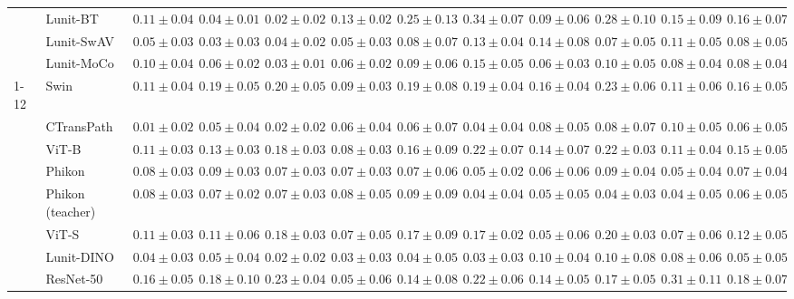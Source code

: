 \begin{tabular}{ll|cccc|c|cccc|c}
 & Lunit-BT & $0.11 \pm 0.04$ & $0.04 \pm 0.01$ & $\mathbf{0.02 \pm 0.02}$ & $0.13 \pm 0.02$ & $0.25 \pm 0.13$ & $0.34 \pm 0.07$ & $0.09 \pm 0.06$ & $0.28 \pm 0.10$ & $0.15 \pm 0.09$ & $0.16 \pm 0.07$ \\
 & Lunit-SwAV & $0.05 \pm 0.03$ & $0.03 \pm 0.03$ & $0.04 \pm 0.02$ & $0.05 \pm 0.03$ & $0.08 \pm 0.07$ & $0.13 \pm 0.04$ & $0.14 \pm 0.08$ & $0.07 \pm 0.05$ & $0.11 \pm 0.05$ & $0.08 \pm 0.05$ \\
 & Lunit-MoCo & $0.10 \pm 0.04$ & $0.06 \pm 0.02$ & $0.03 \pm 0.01$ & $0.06 \pm 0.02$ & $0.09 \pm 0.06$ & $0.15 \pm 0.05$ & $0.06 \pm 0.03$ & $0.10 \pm 0.05$ & $0.08 \pm 0.04$ & $0.08 \pm 0.04$ \\
\cline{1-12}
\multirow[t]{12}{*}{Transformer} & Swin & $0.11 \pm 0.04$ & $0.19 \pm 0.05$ & $0.20 \pm 0.05$ & $0.09 \pm 0.03$ & $0.19 \pm 0.08$ & $0.19 \pm 0.04$ & $0.16 \pm 0.04$ & $0.23 \pm 0.06$ & $0.11 \pm 0.06$ & $0.16 \pm 0.05$ \\
 & CTransPath & $\mathbf{0.01 \pm 0.02}$ & $0.05 \pm 0.04$ & $\mathbf{0.02 \pm 0.02}$ & $0.06 \pm 0.04$ & $0.06 \pm 0.07$ & $0.04 \pm 0.04$ & $0.08 \pm 0.05$ & $0.08 \pm 0.07$ & $0.10 \pm 0.05$ & $0.06 \pm 0.05$ \\
 & ViT-B & $0.11 \pm 0.03$ & $0.13 \pm 0.03$ & $0.18 \pm 0.03$ & $0.08 \pm 0.03$ & $0.16 \pm 0.09$ & $0.22 \pm 0.07$ & $0.14 \pm 0.07$ & $0.22 \pm 0.03$ & $0.11 \pm 0.04$ & $0.15 \pm 0.05$ \\
 & Phikon & $0.08 \pm 0.03$ & $0.09 \pm 0.03$ & $0.07 \pm 0.03$ & $0.07 \pm 0.03$ & $0.07 \pm 0.06$ & $0.05 \pm 0.02$ & $0.06 \pm 0.06$ & $0.09 \pm 0.04$ & $0.05 \pm 0.04$ & $0.07 \pm 0.04$ \\
 & Phikon (teacher) & $0.08 \pm 0.03$ & $0.07 \pm 0.02$ & $0.07 \pm 0.03$ & $0.08 \pm 0.05$ & $0.09 \pm 0.09$ & $0.04 \pm 0.04$ & $\mathbf{0.05 \pm 0.05}$ & $\mathbf{0.04 \pm 0.03}$ & $\mathbf{0.04 \pm 0.05}$ & $0.06 \pm 0.05$ \\
 & ViT-S & $0.11 \pm 0.03$ & $0.11 \pm 0.06$ & $0.18 \pm 0.03$ & $0.07 \pm 0.05$ & $0.17 \pm 0.09$ & $0.17 \pm 0.02$ & $0.05 \pm 0.06$ & $0.20 \pm 0.03$ & $0.07 \pm 0.06$ & $0.12 \pm 0.05$ \\
 & Lunit-DINO & $0.04 \pm 0.03$ & $0.05 \pm 0.04$ & $0.02 \pm 0.02$ & $0.03 \pm 0.03$ & $\mathbf{0.04 \pm 0.05}$ & $\mathbf{0.03 \pm 0.03}$ & $0.10 \pm 0.04$ & $0.10 \pm 0.08$ & $0.08 \pm 0.06$ & $\mathbf{0.05 \pm 0.05}$ \\
 & ResNet-50 & $0.16 \pm 0.05$ & $0.18 \pm 0.10$ & $0.23 \pm 0.04$ & $0.05 \pm 0.06$ & $0.14 \pm 0.08$ & $0.22 \pm 0.06$ & $0.14 \pm 0.05$ & $0.17 \pm 0.05$ & $0.31 \pm 0.11$ & $0.18 \pm 0.07$ \\

\end{tabular}
